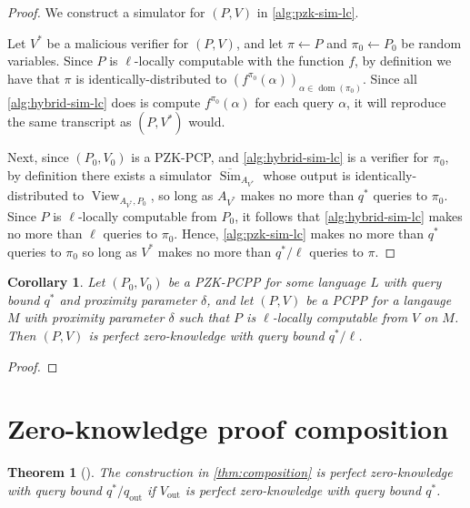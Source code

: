 \documentclass[english,12pt]{reedthesis}
\theoremstyle{plain}
\newtheorem{thm}{Theorem}[section]
\newtheorem{cor}[cor]{Corollary}
\theoremstyle{definition}
\theoremstyle{remark}
\DeclareMathOperator{\dom}{dom}
\DeclareMathOperator{\out}{out}
\DeclareMathOperator{\Sim}{Sim}
\DeclareMathOperator{\View}{View}
\begin{document}
\begin{proof}
  We construct a simulator for $(P, V)$ in \cref{alg:pzk-sim-lc}.

  Let $V^{*}$ be a malicious verifier for $(P, V)$, and let $\pi \leftarrow P$ and
  $\pi_{0} \leftarrow P_{0}$ be random variables. Since $P$ is $\ell$-locally computable with
  the function $f$, by definition we have that $\pi$ is identically-distributed to
  $(f^{\pi_{0}}(\alpha))_{\alpha \in \dom(\pi_{0})}$.
  Since all \cref{alg:hybrid-sim-lc} does is compute $f^{\pi_{0}}(\alpha)$ for each
  query $\alpha$, it will reproduce the same transcript as $(P, V^{*})$ would.

  Next, since $(P_{0}, V_{0})$ is a PZK-PCP, and \cref{alg:hybrid-sim-lc} is a
  verifier for $\pi_{0}$, by definition there exists a simulator
  $\overline{\Sim}_{A_{V^{*}}}$ whose output is identically-distributed to
  $\View_{A_{V^{*}}, P_{0}}$, so long as $A_{V^{*}}$ makes no more than $q^{*}$
  queries to $\pi_{0}$. Since $P$ is $\ell$-locally computable from $P_{0}$, it
  follows that \cref{alg:hybrid-sim-lc} makes no more than $\ell$ queries to
  $\pi_{0}$. Hence, \cref{alg:pzk-sim-lc} makes no more than $q^{*}$ queries to
  $\pi_{0}$ so long as $V^{*}$ makes no more than $q^{*}/\ell$ queries to $\pi$.
\end{proof}

\begin{cor}\label{cor:local-comp-pzk}
  Let $(P_{0}, V_{0})$ be a PZK-PCPP for some language $L$ with query bound
  $q^{*}$ and proximity parameter $\delta$, and let $(P, V)$ be a PCPP for a langauge
  $M$ with proximity parameter $\delta$ such that $P$ is $\ell$-locally computable
  from $V$ on $M$. Then $(P, V)$ is perfect zero-knowledge with query bound
  $q^{*}/\ell$.
\end{cor}

\begin{proof}
\end{proof}

\section{Zero-knowledge proof composition}\label{sec:zk-proof-comp}

\begin{thm}[{\cite[Theorem 3.7]{GOS25}}]\label{thm:comp-pzk}
  The construction in \cref{thm:composition} is perfect zero-knowledge with
  query bound $q^{*}/q_{\out}$ if $V_{\out}$ is perfect zero-knowledge with
  query bound $q^{*}$.
\end{thm}
\end{document}
